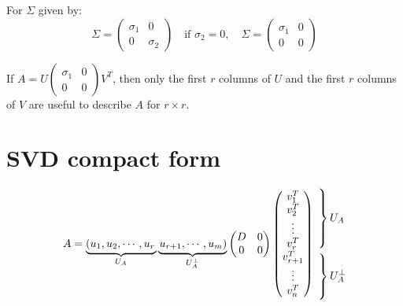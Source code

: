 For $\Sigma$ given by:
\[
\Sigma = \begin{pmatrix}
\sigma_1 & 0 \\
0 & \sigma_2
\end{pmatrix} \quad \text{if } \sigma_2 = 0, \quad \Sigma = \begin{pmatrix}
\sigma_1 & 0 \\
0 & 0
\end{pmatrix}
\]

If $A = U \begin{pmatrix}
\sigma_1 & 0 \\
0 & 0
\end{pmatrix} V^T$, then only the first $r$ columns of $U$ and the first $r$ columns of $V$ are useful to describe $A$ for $r \times r$.

\section{SVD compact form}
$$
A = \underbrace{\left(u_1, u_2, \cdots, u_r\right.}_{U_A} \underbrace{\left.u_{r+1}, \cdots, u_m\right)}_{U_A^\perp}
\begin{pmatrix}
D & 0 \\
0 & 0
\end{pmatrix}
    \begin{pmatrix}
        v_1^T \\
        v_2^T \\
        \vdots \\
        v_r^T \\
        v_{r+1}^T \\
        \vdots \\
        v_n^T
        \end{pmatrix}
    \begin{aligned}
        &\left.
            \vphantom{\begin{matrix}
                u_1 \\
                u_2 \\
                \vdots \\
                u_r 
                \end{matrix}}
        \right\}U_A \\
        &\left.
            \vphantom{\begin{matrix}
                u_1 \\
                \vdots \\
                u_r 
                \end{matrix}}
        \right\}U_A^\perp
    \end{aligned}
$$
    
